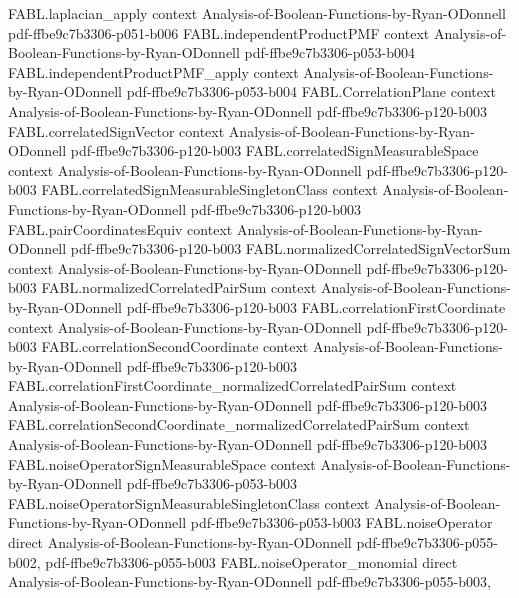 \begin{theorem}
\proofstep
  {FABL.laplacian_apply}
  {context}
  {Analysis-of-Boolean-Functions-by-Ryan-ODonnell}
  {pdf-ffbe9c7b3306-p051-b006}
\proofstep
  {FABL.independentProductPMF}
  {context}
  {Analysis-of-Boolean-Functions-by-Ryan-ODonnell}
  {pdf-ffbe9c7b3306-p053-b004}
\proofstep
  {FABL.independentProductPMF_apply}
  {context}
  {Analysis-of-Boolean-Functions-by-Ryan-ODonnell}
  {pdf-ffbe9c7b3306-p053-b004}
\proofstep
  {FABL.CorrelationPlane}
  {context}
  {Analysis-of-Boolean-Functions-by-Ryan-ODonnell}
  {pdf-ffbe9c7b3306-p120-b003}
\proofstep
  {FABL.correlatedSignVector}
  {context}
  {Analysis-of-Boolean-Functions-by-Ryan-ODonnell}
  {pdf-ffbe9c7b3306-p120-b003}
\proofstep
  {FABL.correlatedSignMeasurableSpace}
  {context}
  {Analysis-of-Boolean-Functions-by-Ryan-ODonnell}
  {pdf-ffbe9c7b3306-p120-b003}
\proofstep
  {FABL.correlatedSignMeasurableSingletonClass}
  {context}
  {Analysis-of-Boolean-Functions-by-Ryan-ODonnell}
  {pdf-ffbe9c7b3306-p120-b003}
\proofstep
  {FABL.pairCoordinatesEquiv}
  {context}
  {Analysis-of-Boolean-Functions-by-Ryan-ODonnell}
  {pdf-ffbe9c7b3306-p120-b003}
\proofstep
  {FABL.normalizedCorrelatedSignVectorSum}
  {context}
  {Analysis-of-Boolean-Functions-by-Ryan-ODonnell}
  {pdf-ffbe9c7b3306-p120-b003}
\proofstep
  {FABL.normalizedCorrelatedPairSum}
  {context}
  {Analysis-of-Boolean-Functions-by-Ryan-ODonnell}
  {pdf-ffbe9c7b3306-p120-b003}
\proofstep
  {FABL.correlationFirstCoordinate}
  {context}
  {Analysis-of-Boolean-Functions-by-Ryan-ODonnell}
  {pdf-ffbe9c7b3306-p120-b003}
\proofstep
  {FABL.correlationSecondCoordinate}
  {context}
  {Analysis-of-Boolean-Functions-by-Ryan-ODonnell}
  {pdf-ffbe9c7b3306-p120-b003}
\proofstep
  {FABL.correlationFirstCoordinate_normalizedCorrelatedPairSum}
  {context}
  {Analysis-of-Boolean-Functions-by-Ryan-ODonnell}
  {pdf-ffbe9c7b3306-p120-b003}
\proofstep
  {FABL.correlationSecondCoordinate_normalizedCorrelatedPairSum}
  {context}
  {Analysis-of-Boolean-Functions-by-Ryan-ODonnell}
  {pdf-ffbe9c7b3306-p120-b003}
\proofstep
  {FABL.noiseOperatorSignMeasurableSpace}
  {context}
  {Analysis-of-Boolean-Functions-by-Ryan-ODonnell}
  {pdf-ffbe9c7b3306-p053-b003}
\proofstep
  {FABL.noiseOperatorSignMeasurableSingletonClass}
  {context}
  {Analysis-of-Boolean-Functions-by-Ryan-ODonnell}
  {pdf-ffbe9c7b3306-p053-b003}
\proofstep
  {FABL.noiseOperator}
  {direct}
  {Analysis-of-Boolean-Functions-by-Ryan-ODonnell}
  {pdf-ffbe9c7b3306-p055-b002,
    pdf-ffbe9c7b3306-p055-b003}
\proofstep
  {FABL.noiseOperator_monomial}
  {direct}
  {Analysis-of-Boolean-Functions-by-Ryan-ODonnell}
  {pdf-ffbe9c7b3306-p055-b003,
}
\end{theorem}
